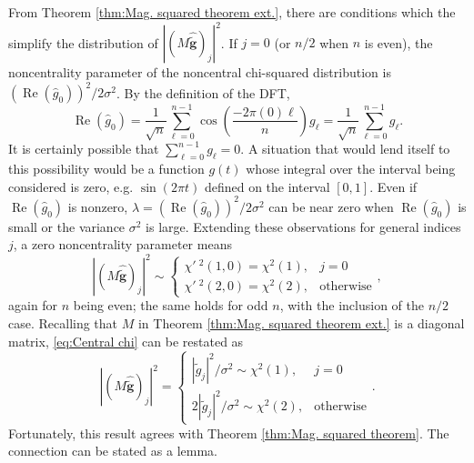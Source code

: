 \documentclass[12pt]{book}
\newcommand{\gnoiseVec}{\widetilde{\mathbf{g}}}	%
\newcommand{\noiseSD}{\sigma}	%
\renewcommand{\Re}{\operatorname{Re}}	%
\newcommand{\NCchi}{\chi'\:}	%
\begin{document}
From Theorem \ref{thm:Mag. squared theorem ext.}, there are conditions which the simplify the distribution of $|(M\widehat{\gnoiseVec})_j|^2$. If $j = 0$ (or $n/2$ when $n$ is even), the noncentrality parameter of the noncentral chi-squared distribution is $(\Re(\widehat{g}_0))^2/2\noiseSD^2$. By the definition of the DFT,
\[\Re(\widehat{g}_0) = \frac{1}{\sqrt{n}}\sum_{\ell=0}^{n-1} \cos\left(\frac{-2\pi(0)\ell}{n}\right)g_\ell = \frac{1}{\sqrt{n}}\sum_{\ell=0}^{n-1} g_\ell.\]
It is certainly possible that $\sum_{\ell=0}^{n-1} g_\ell = 0$. A situation that would lend itself to this possibility would be a function $g(t)$ whose integral over the interval being considered is zero, e.g. $\sin(2\pi{t})$ defined on the interval $[0,1]$. Even if $\Re(\widehat{g}_0)$ is nonzero, $\lambda = (\Re(\widehat{g}_0))^2/2\noiseSD^2$ can be near zero when $\Re(\widehat{g}_0)$ is small or the variance $\noiseSD^2$ is large. Extending these observations for general indices $j$, a zero noncentrality parameter means
\begin{equation}
\label{eq:Central chi}
|(M\widehat{\gnoiseVec})_j|^2 \sim \begin{cases}
\NCchi^2\left(1,0\right) = \chi^2(1), & j = 0 \\
\NCchi^2\left(2,0\right) = \chi^2(2), & \text{otherwise} \end{cases},
\end{equation}
again for $n$ being even; the same holds for odd $n$, with the inclusion of the $n/2$ case.  Recalling that $M$ in Theorem \ref{thm:Mag. squared theorem ext.} is a diagonal matrix, \eqref{eq:Central chi} can be restated as
\[|(M\widehat{\gnoiseVec})_j|^2 = \begin{cases}
|\widehat{\tilde{g}}_j|^2/\noiseSD^2 \sim \chi^2(1), & j = 0 \\
2|\widehat{\tilde{g}}_j|^2/\noiseSD^2 \sim \chi^2(2), & \text{otherwise} \end{cases}.\]
Fortunately, this result agrees with Theorem \ref{thm:Mag. squared theorem}. The connection can be stated as a lemma.
\end{document}
